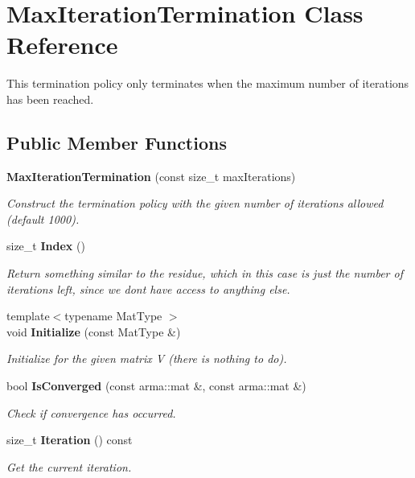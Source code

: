 \section{Max\+Iteration\+Termination Class Reference}
\label{classmlpack_1_1amf_1_1MaxIterationTermination}


This termination policy only terminates when the maximum number of iterations has been reached.  


\subsection*{Public Member Functions}
\begin{DoxyCompactItemize}
\item 
\textbf{ Max\+Iteration\+Termination} (const size\+\_\+t max\+Iterations)
\begin{DoxyCompactList}\small\item\em Construct the termination policy with the given number of iterations allowed (default 1000). \end{DoxyCompactList}\item 
size\+\_\+t \textbf{ Index} ()
\begin{DoxyCompactList}\small\item\em Return something similar to the residue, which in this case is just the number of iterations left, since we don\textquotesingle{}t have access to anything else. \end{DoxyCompactList}\item 
{\footnotesize template$<$typename Mat\+Type $>$ }\\void \textbf{ Initialize} (const Mat\+Type \&)
\begin{DoxyCompactList}\small\item\em Initialize for the given matrix V (there is nothing to do). \end{DoxyCompactList}\item 
bool \textbf{ Is\+Converged} (const arma\+::mat \&, const arma\+::mat \&)
\begin{DoxyCompactList}\small\item\em Check if convergence has occurred. \end{DoxyCompactList}\item 
size\+\_\+t \textbf{ Iteration} () const
\begin{DoxyCompactList}\small\item\em Get the current iteration. \end{DoxyCompactList}\item 

\end{DoxyCompactItemize}
